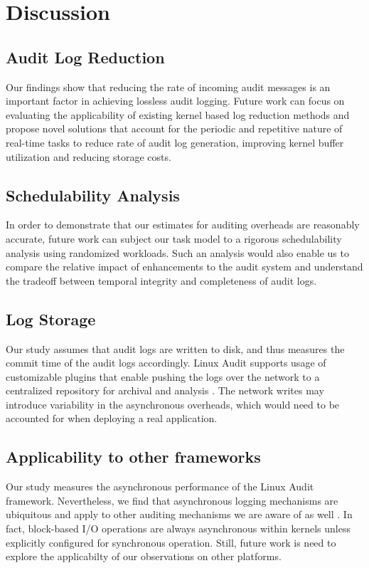 \section{Discussion}
\subsection{Audit Log Reduction} Our findings show that reducing the rate of incoming audit messages is an important factor in achieving lossless audit logging. Future work can focus on evaluating the applicability of existing kernel based log reduction methods \cite{Ma2018,Ma2016} and propose novel solutions that account for the periodic and repetitive nature of real-time tasks to reduce rate of audit log generation, improving kernel buffer utilization and reducing storage costs.

\subsection{Schedulability Analysis} In order to demonstrate that our estimates for auditing overheads are reasonably accurate, future work can subject our task model to a rigorous schedulability analysis using randomized workloads. Such an analysis would also enable us to compare the relative impact of enhancements to the audit system and understand the tradeoff between temporal integrity and completeness of audit logs.

\subsection{Log Storage} Our study assumes that audit logs are written to disk, and thus measures the commit time of the audit logs accordingly. Linux Audit supports usage of customizable plugins that enable pushing the logs over the network to a centralized repository for archival and analysis \cite{audisp-remote}. The network writes may introduce variability in the asynchronous overheads, which would need to be accounted for when deploying a real application. 

\subsection{Applicability to other frameworks} Our study measures the asynchronous performance of the Linux Audit framework. Nevertheless, we find that asynchronous logging mechanisms are ubiquitous and apply to other auditing mechanisms we are aware of as well \cite{Bates2015,Ma2015,Ma2016,ETW,Procmon}. In fact, block-based I/O operations are always asynchronous within kernels unless explicitly configured for synchronous operation. Still, future work is need to explore the applicabilty of our observations on other platforms.